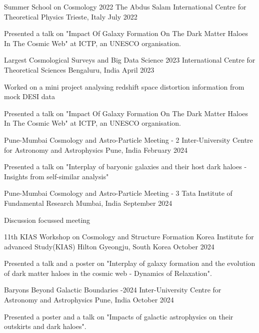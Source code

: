 \begin{cventries}

{
\cventry
{Summer School on Cosmology 2022}
{The Abdus Salam International Centre for Theoretical Physics}
{Trieste, Italy}
{July 2022}
{
\begin{cvitems}
\item {Presented a talk on "Impact Of Galaxy Formation On The Dark Matter Haloes In The Cosmic Web" at ICTP, an UNESCO organisation.}
\end{cvitems}
}
}

{
\cventry
{Largest Cosmological Surveys and Big Data Science 2023}
{International Centre for Theoretical Sciences}
{Bengaluru, India}
{April 2023}
{
\begin{cvitems}
\item {Worked on a mini project analysing redshift space distortion information from mock DESI data}
\item {Presented a talk on "Impact Of Galaxy Formation On The Dark Matter Haloes In The Cosmic Web" at ICTP, an UNESCO organisation.}
\end{cvitems}
}
}


{
\cventry
{Pune-Mumbai Cosmology and Astro-Particle Meeting - 2}
{Inter-University Centre for Astronomy and Astrophysics}
{Pune, India}
{February 2024}
{
\begin{cvitems}
\item {Presented a talk on "Interplay of baryonic galaxies and their host dark haloes - Insights from self-similar analysis"}
\end{cvitems}
}
}

{
\cventry
{Pune-Mumbai Cosmology and Astro-Particle Meeting - 3}
{Tata Institute of Fundamental Research}
{Mumbai, India}
{September 2024}
{
\begin{cvitems}
\item {Discussion focussed meeting}
\end{cvitems}
}
}

{
\cventry
{11th KIAS Workshop on Cosmology and Structure Formation}
{Korea Institute for advanced Study(KIAS)}
{Hilton Gyeongju, South Korea}
{October 2024}
{
\begin{cvitems}
\item {Presented a talk and a poster on "Interplay of galaxy formation and the evolution of dark matter haloes in the cosmic web - Dynamics of Relaxation".}
\end{cvitems}
}
}

{
\cventry
{Baryons Beyond Galactic Boundaries -2024}
{Inter-University Centre for Astronomy and Astrophysics}
{Pune, India}
{October 2024}
{
\begin{cvitems}
\item {Presented a poster and a talk on "Impacts of galactic astrophysics on their outskirts and dark haloes".}
\end{cvitems}
}
}



\end{cventries}
